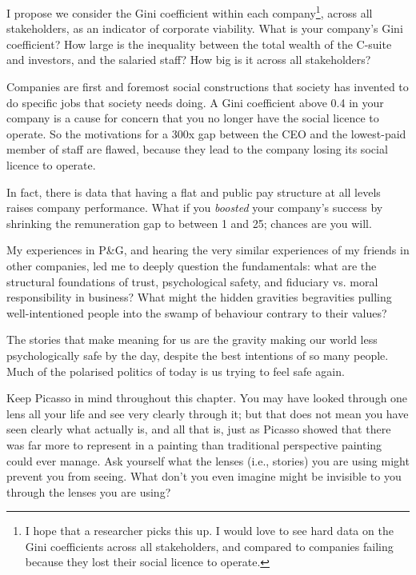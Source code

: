 I propose we consider the Gini coefficient within each company\footnote{I hope that a researcher picks this up. I would love to see hard data on the Gini coefficients across all stakeholders, and compared to companies failing because they lost their social licence to operate.}, across all stakeholders, as an indicator of corporate viability. What is your company’s Gini coefficient? How large is the inequality between the total wealth of the C-suite and investors, and the salaried staff? How big is it across all stakeholders? 


Companies are first and foremost social constructions that society has invented to do specific jobs that society needs doing. A Gini coefficient  above 0.4 in your company is a cause for concern that you no longer have the social licence to operate. So the motivations for a 300x gap between the CEO and the lowest-paid member of staff are flawed, because they lead to the company losing its social licence to operate. 


In fact, there is data that having a flat and public pay structure at all levels raises company performance\cite{kristof-gravity-70minwage}. What if you \emph{boosted} your company's success by shrinking the remuneration gap to between 1 and 25; chances are you will.


My experiences in P\&G, and hearing the very similar experiences of my friends in other companies, led me to deeply question the fundamentals: what are the structural foundations of trust, psychological safety, and fiduciary vs. moral responsibility in business? What might the hidden gravities be\textemdash gravities pulling well-intentioned people into the swamp of behaviour contrary to their values? 


The stories that make meaning for us are the gravity making our world less psychologically safe by the day, despite the best intentions of so many people. Much of the polarised politics of today is us trying to feel safe again.


Keep Picasso in mind throughout this chapter. You may have looked through one lens all your life and see very clearly through it; but that does not mean you have seen clearly what actually is, and all that is, just as Picasso showed that there was far more to represent in a painting than traditional perspective painting could ever manage. Ask yourself what the lenses (i.e., stories) you are using might prevent you from seeing. What don't you even imagine might be invisible to you through the lenses you are using?
